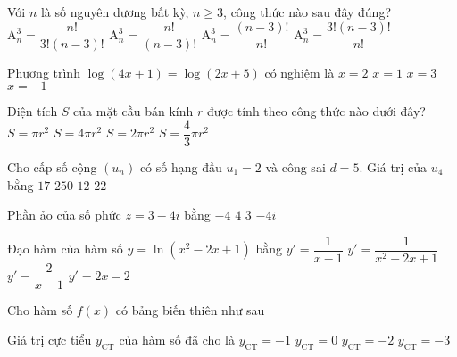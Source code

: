 \begin{ex}%
	Với $n$ là số nguyên dương bất kỳ, $n\ge 3$, công thức nào sau đây đúng?
	\choice
	{$\mathrm{A}^3_n=\dfrac{n!}{3!(n-3)!}$}
	{\True $\mathrm{A}^3_n=\dfrac{n!}{(n-3)!}$}
	{$\mathrm{A}^3_n=\dfrac{(n-3)!}{n!}$}
	{$\mathrm{A}^3_n=\dfrac{3!(n-3)!}{n!}$}
\end{ex}
\begin{ex}%
	Phương trình $\log (4x+1)=\log (2x+5)$ có nghiệm là
	\choice
	{\True $x=2$}
	{$x=1$}
	{$x=3$}
	{$x=-1$}
\end{ex}
\begin{ex}%
	Diện tích $S$ của mặt cầu bán kính $r$ được tính theo công thức nào dưới đây?
	\choice
	{$S=\pi r^2$}
	{\True $S=4\pi r^2$}
	{$S=2\pi r^2$}
	{$S=\dfrac{4}{3}\pi r^2$}
\end{ex}
\begin{ex}%
	Cho cấp số cộng $(u_n)$ có số hạng đầu $u_1=2$ và công sai $d=5$. Giá trị của $u_4$ bằng
	\choice
	{\True $17$}
	{$250$}
	{$12$}
	{$22$}
\end{ex}
\begin{ex}%
	Phần ảo của số phức $z=3-4i$ bằng
	\choice
	{\True $-4$}
	{$4$}
	{$3$}
	{$-4i$}
\end{ex}
\begin{ex}%
	Đạo hàm của hàm số $y=\ln (x^2-2x+1)$ bằng
	\choice
	{$y'=\dfrac{1}{x-1}$}
	{$y'=\dfrac{1}{x^2-2x+1}$}
	{\True $y'=\dfrac{2}{x-1}$}
	{$y'=2x-2$}
\end{ex}
\begin{ex}%
	Cho hàm số $f(x)$ có bảng biến thiên như sau
\begin{center}
\end{center}
	Giá trị cực tiểu $y_{\text{CT}}$ của hàm số đã cho là
	\choice
	{$y_{\text{CT}}=-1$}
	{$y_{\text{CT}}=0$}
	{$y_{\text{CT}}=-2$}
	{\True $y_{\text{CT}}=-3$}
\end{ex}

